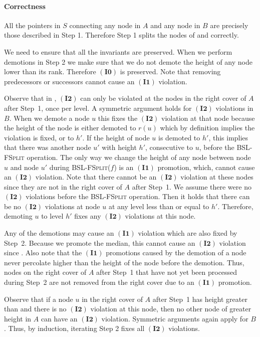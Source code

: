 \documentclass[11pt]{article}
\newcommand{\Bslfspl}{\mbox{\textsc{BSL-FSplit}}}
\newcommand{\Bslfsplx}[1]{\mbox{\textsc{BSL-FSplit(\ensuremath{#1})}}}
\newcommand{\invzero}{\ensuremath{\mathbf{(I0)}}}
\newcommand{\invone}{\ensuremath{\mathbf{(I1)}}}
\newcommand{\invtwo}{\ensuremath{\mathbf{(I2)}}}
\newcommand{\prevheight}{\ensuremath{h'}}
\newcommand{\noderank}[1]{\ensuremath{r(\node #1)}}
\newcommand{\node}[1]{\ensuremath{#1}}
\newcommand{\bsl}[1]{\ensuremath{#1}}
\begin{document}
\paragraph{Correctness} All the pointers in \bsl S connecting any node in \bsl A and any node in \bsl B are precisely those described in Step 1. Therefore Step 1 splits the nodes of  and  correctly. 

We need to ensure that all the invariants are preserved. When we perform demotions in Step 2 we make sure that we do not demote the height of any node lower than its rank. Therefore \invzero{} is preserved. Note that removing predecessors or successors cannot cause an \invone{} violation. 

Observe that in , \invtwo{} can only be violated at the nodes in the right cover of \bsl A after Step~1, once per level. A symmetric argument holds for \invtwo{} violations in \bsl B. 
When we demote a node \node u this fixes the \invtwo{} violation at that node because the height of the node is either demoted to \noderank u which by definition implies the violation is fixed, or to \prevheight{}. 
If the height of node \node u is demoted to \prevheight{}, this implies that there was another node \node{u'} with height \prevheight{}, consecutive to \node u, before the \Bslfspl{} operation. 
The only way we change the height of any node between node \node u and node \node{u'} during \Bslfsplx{f} is an \invone{} promotion, which, cannot cause an \invtwo{} violation. Note that there cannot be an \invtwo{} violation at these nodes since they are not in the right cover of \bsl A after Step~1. We assume there were no \invtwo{} violations before the \Bslfspl{} operation. Then it holds that there can be no \invtwo{} violations at node \node u at any level less than or equal to \prevheight{}. Therefore, demoting \node u to level \prevheight{} fixes any \invtwo{} violations at this node. 

Any of the demotions may cause an \invone{} violation which are also fixed by Step~2. Because we promote the median, this cannot cause an \invtwo{} violation since . Also note that the \invone{} promotions caused by the demotion of a node never percolate higher than the height of the node before the demotion. Thus, nodes on the right cover of \bsl A after Step~1 that have not yet been processed during Step~2 are not removed from the right cover due to an \invone{} promotion. 

Observe that if a node \node u in the right cover of \bsl A after Step~1 has height greater than   and there is no \invtwo{} violation at this node, then no other node of greater height in \bsl A can have an \invtwo{} violation. Symmetric arguments again apply for \bsl B. Thus, by induction, iterating Step 2 fixes all \invtwo{} violations. 
\end{document}
